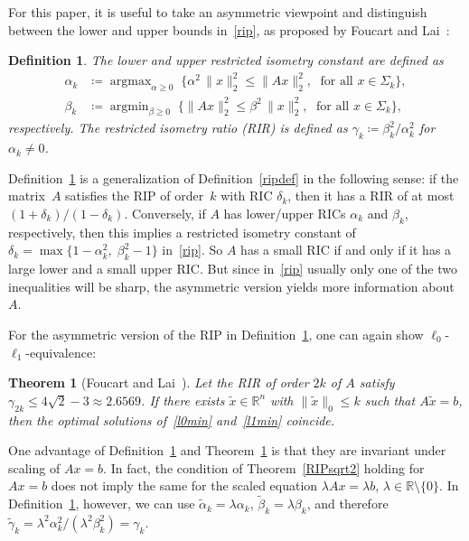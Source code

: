 \documentclass[journal]{IEEEtran}
\newtheorem{theorem}{Theorem}
\newtheorem{definition}{Definition}
\DeclareMathOperator*{\argmin}{argmin}
\DeclareMathOperator*{\argmax}{argmax}
\newcommand{\define}{\coloneqq}
\newcommand{\Norm}[2]{\lVert{#1}\rVert_{#2}}
\newcommand{\R}{\mathds{R}}
\begin{document}
For this paper, it is useful to take an asymmetric viewpoint and
distinguish between the lower and upper bounds in~\eqref{rip}, as proposed
by Foucart and Lai~\cite{FL09}:

\begin{definition}\label{asymRIPdef}
 The \emph{lower} and \emph{upper restricted isometry constant} are defined as
 \begin{align}
   \alpha_k & \define \argmax_{\alpha \geq 0}\; \big\{ \alpha^2\, \Norm{x}{2}^2
   \leq \Norm{Ax}{2}^2,\; \text{ for all }x \in \Sigma_k\big\}, \label{lowerRIP}\\
   \beta_k & \define \argmin_{\beta \geq 0}\; \big\{ \Norm{Ax}{2}^2 \leq \beta^2\,
   \Norm{x}{2}^2,\; \text{ for all }x \in \Sigma_k\big\},\label{upperRIP}
 \end{align}
 respectively. The \emph{restricted isometry ratio} (RIR) is
 defined as $\gamma_k \define \beta_k^2 / \alpha_k^2$ for $\alpha_k \neq 0$.
\end{definition}

Definition~\ref{asymRIPdef} is a generalization of Definition~\ref{ripdef}
in the following sense: if the matrix~$A$ satisfies the RIP of order~$k$
with RIC $\delta_k$, then it has a RIR of at most $(1 + \delta_k) / (1 -
\delta_k)$. Conversely, if $A$ has lower/upper RICs $\alpha_k$ and
$\beta_k$, respectively, then this implies a restricted isometry constant
of $\delta_k = \max \{1 - \alpha_k^2,\; \beta_k^2 - 1\}$ in~\eqref{rip}.
So $A$ has a small RIC if and only if it has a large lower and a small upper 
RIC. But since in~\eqref{rip} usually only one of the two inequalities will 
be sharp, the asymmetric version yields more information about~$A$.

For the asymmetric version of the RIP in Definition~\ref{asymRIPdef}, one
can again show $\ell_0$-$\ell_1$-equivalence:

\begin{theorem}[Foucart and Lai~\cite{FL09}]\label{asymRIPtheorem}
  Let the RIR of order $2k$ of $A$ satisfy $\gamma_{2k} \leq 4 \sqrt{2} - 3 \approx 2.6569$. If
  there exists $\tilde{x} \in \R^n$ with $\Norm{\tilde{x}}{0} \leq k$ such
  that $A\tilde{x} = b$, then the optimal solutions of~\eqref{l0min}
  and~\eqref{l1min} coincide.
\end{theorem}

One advantage
of Definition~\ref{asymRIPdef} and Theorem~\ref{asymRIPtheorem} is that they
are invariant under scaling of $Ax = b$. In fact, the condition of
Theorem~\ref{RIPsqrt2} holding for~$A x = b$ does not imply the same 
for the scaled equation
$\lambda Ax = \lambda b$, $\lambda \in \R \setminus \{0\}$. In Definition~\ref{asymRIPdef}, however, we can
use $\tilde{\alpha}_k = \lambda \alpha_k$, $\tilde{\beta}_k = \lambda
\beta_k$, and therefore $\tilde{\gamma}_k = \lambda^2 \alpha_k^2 /
(\lambda^2 \beta_k^2) = \gamma_k$.
\end{document}
